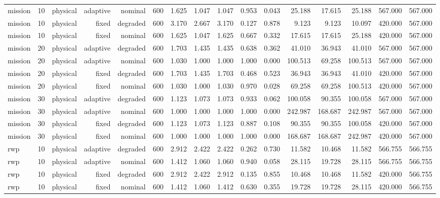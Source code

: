 \begin{tabular}{lrrrrrrrrrrrrrrr}
mission & 10 & physical & adaptive & nominal & 600 & 1.625 & 1.047 & 1.047 & 0.953 & 0.043 & 25.188 & 17.615 & 25.188 & 567.000 & 567.000 \\
mission & 10 & physical & fixed & degraded & 600 & 3.170 & 2.667 & 3.170 & 0.127 & 0.878 & 9.123 & 9.123 & 10.097 & 420.000 & 567.000 \\
mission & 10 & physical & fixed & nominal & 600 & 1.625 & 1.047 & 1.625 & 0.667 & 0.332 & 17.615 & 17.615 & 25.188 & 420.000 & 567.000 \\
mission & 20 & physical & adaptive & degraded & 600 & 1.703 & 1.435 & 1.435 & 0.638 & 0.362 & 41.010 & 36.943 & 41.010 & 567.000 & 567.000 \\
mission & 20 & physical & adaptive & nominal & 600 & 1.030 & 1.000 & 1.000 & 1.000 & 0.000 & 100.513 & 69.258 & 100.513 & 567.000 & 567.000 \\
mission & 20 & physical & fixed & degraded & 600 & 1.703 & 1.435 & 1.703 & 0.468 & 0.523 & 36.943 & 36.943 & 41.010 & 420.000 & 567.000 \\
mission & 20 & physical & fixed & nominal & 600 & 1.030 & 1.000 & 1.030 & 0.970 & 0.028 & 69.258 & 69.258 & 100.513 & 420.000 & 567.000 \\
mission & 30 & physical & adaptive & degraded & 600 & 1.123 & 1.073 & 1.073 & 0.933 & 0.062 & 100.058 & 90.355 & 100.058 & 567.000 & 567.000 \\
mission & 30 & physical & adaptive & nominal & 600 & 1.000 & 1.000 & 1.000 & 1.000 & 0.000 & 242.987 & 168.687 & 242.987 & 567.000 & 567.000 \\
mission & 30 & physical & fixed & degraded & 600 & 1.123 & 1.073 & 1.123 & 0.887 & 0.108 & 90.355 & 90.355 & 100.058 & 420.000 & 567.000 \\
mission & 30 & physical & fixed & nominal & 600 & 1.000 & 1.000 & 1.000 & 1.000 & 0.000 & 168.687 & 168.687 & 242.987 & 420.000 & 567.000 \\
rwp & 10 & physical & adaptive & degraded & 600 & 2.912 & 2.422 & 2.422 & 0.262 & 0.730 & 11.582 & 10.468 & 11.582 & 566.755 & 566.755 \\
rwp & 10 & physical & adaptive & nominal & 600 & 1.412 & 1.060 & 1.060 & 0.940 & 0.058 & 28.115 & 19.728 & 28.115 & 566.755 & 566.755 \\
rwp & 10 & physical & fixed & degraded & 600 & 2.912 & 2.422 & 2.912 & 0.135 & 0.855 & 10.468 & 10.468 & 11.582 & 420.000 & 566.755 \\
rwp & 10 & physical & fixed & nominal & 600 & 1.412 & 1.060 & 1.412 & 0.630 & 0.355 & 19.728 & 19.728 & 28.115 & 420.000 & 566.755 \\

\end{tabular}
